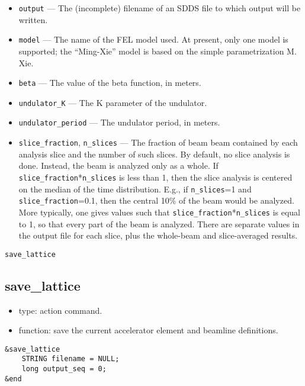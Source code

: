 \documentclass[11pt]{article}
\begin{document}
\begin{itemize}
\item \verb|output| --- The (incomplete) filename of an SDDS file to which output will be
written.
\item \verb|model| --- The name of the FEL model used.  At present, only one model is
supported; the ``Ming-Xie'' model is based on the simple parametrization M. Xie\cite{MingXie}.
\item \verb|beta| --- The value of the beta function, in meters.
\item \verb|undulator_K| --- The K parameter of the undulator.
\item \verb|undulator_period| --- The undulator period, in meters.
\item \verb|slice_fraction|, \verb|n_slices| --- The fraction of beam beam contained by each analysis slice
        and the number of such slices.
        By default, no slice analysis is done.  Instead, the beam is analyzed only as a whole.
        If \verb|slice_fraction|*\verb|n_slices| is less than 1, then the slice analysis
        is centered on the median of the time distribution.  E.g., if \verb|n_slices|=1 and
        \verb|slice_fraction|=0.1, then the central 10\% of the beam would be analyzed.
        More typically, one gives values such that \verb|slice_fraction|*\verb|n_slices| is
        equal to 1, so that every part of the beam is analyzed.  There are separate values in
        the output file for each slice, plus the whole-beam and slice-averaged results.
\end{itemize}

\begin{latexonly}
\newpage
\begin{center}{\Large\verb|save_lattice|}\end{center}
\end{latexonly}
\subsection{save\_lattice \label{subsec:savelattice}}

\begin{itemize}
\item type: action command.
\item function: save the current accelerator element and beamline definitions.
\end{itemize}

\begin{verbatim}
&save_lattice
    STRING filename = NULL;
    long output_seq = 0;
&end
\end{verbatim}
\end{document}
